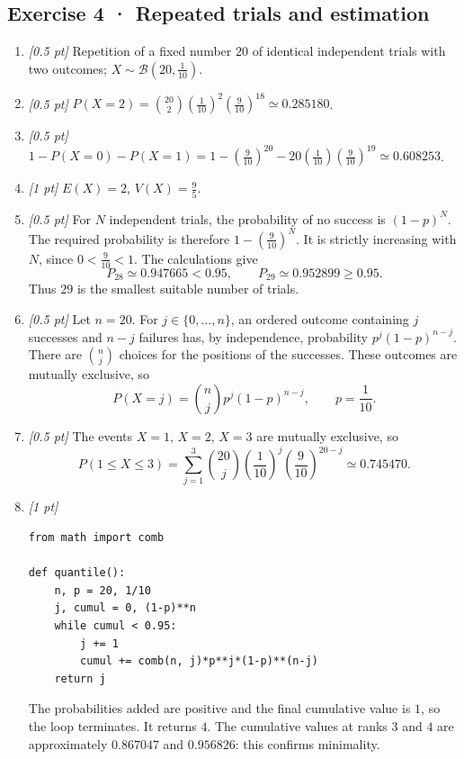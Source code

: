 \subsection*{Exercise 4 · Repeated trials and estimation}\begin{enumerate}

\item \textit{[0.5 pt]} Repetition of a fixed number $20$ of identical independent trials with two outcomes; $X\sim\mathcal B(20,\frac{1}{10})$.

\item \textit{[0.5 pt]} $P(X=2)=\binom{20}2(\frac{1}{10})^2(\frac{9}{10})^{18}\simeq\num{0,285180}$.

\item \textit{[0.5 pt]} $1-P(X=0)-P(X=1)=1-(\frac{9}{10})^{20}-20(\frac{1}{10})(\frac{9}{10})^{19}\simeq\num{0,608253}$.

\item \textit{[1 pt]} $E(X)=2$, $V(X)=\frac{9}{5}$.

\item \textit{[0.5 pt]} For $N$ independent trials, the probability of no success is $(1-p)^N$. The required probability is therefore $1-(\frac{9}{10})^N$. It is strictly increasing with $N$, since $0<\frac{9}{10}<1$. The calculations give
\[P_{28}\simeq\num{0,947665}<\num{0,95},\qquad P_{29}\simeq\num{0,952899}\ge\num{0,95}.\]
Thus $29$ is the smallest suitable number of trials.

\item \textit{[0.5 pt]} Let $n=20$. For $j\in\{0,\ldots,n\}$, an ordered outcome containing $j$ successes and $n-j$ failures has, by independence, probability $p^j(1-p)^{n-j}$. There are $\binom nj$ choices for the positions of the successes. These outcomes are mutually exclusive, so
\[P(X=j)=\binom nj p^j(1-p)^{n-j},\qquad p=\frac{1}{10}.\]

\item \textit{[0.5 pt]} The events $X=1$, $X=2$, $X=3$ are mutually exclusive, so
\[P(1\le X\le3)=\sum_{j=1}^3\binom{20}j(\frac{1}{10})^j(\frac{9}{10})^{20-j}\simeq\num{0,745470}.\]


\item \textit{[1 pt]} 
\begin{lstlisting}
from math import comb

def quantile():
    n, p = 20, 1/10
    j, cumul = 0, (1-p)**n
    while cumul < 0.95:
        j += 1
        cumul += comb(n, j)*p**j*(1-p)**(n-j)
    return j
\end{lstlisting}
The probabilities added are positive and the final cumulative value is $1$, so the loop terminates. It returns $4$. The cumulative values at ranks $3$ and $4$ are approximately $\num{0,867047}$ and $\num{0,956826}$: this confirms minimality.

\end{enumerate}

\fi

\fi

